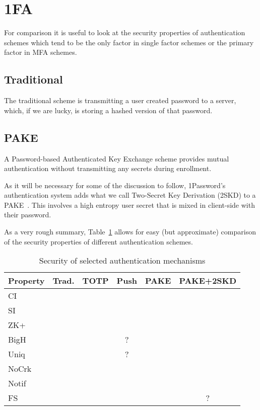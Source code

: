 \documentclass{soups}
\newcommand{\cmark}{\ding{51}}%
\newcommand{\xmark}{\ding{53}}%
\begin{document}
\section{1FA}

For comparison it is useful to look at the security properties
of authentication schemes which tend to be the only factor in single
factor schemes or the primary factor in MFA schemes.

\subsection{Traditional}
The traditional scheme is transmitting a user created password to a server,
which, if we are lucky, is storing a hashed version of that password.

\subsection{PAKE}
A Password-based Authenticated Key Exchange scheme provides mutual authentication
without transmitting any secrets during enrollment.

As it will be necessary for some of the discussion to follow,
1Password's authentication system adds what we call
Two-Secret Key Derivation (2SKD) to a PAKE~\autocite{1Password:whitepaper}.
This involves a
high entropy user secret that is mixed in client-side with their password.

As a very rough summary, Table~\ref{tab:props} allows for easy
(but approximate) comparison of the security properties of different
authentication schemes.

\begin{table}
  \caption{Security of selected authentication mechanisms}\label{tab:props}
  \begin{tabular}{lccccc}
    \textbf{Property} & \textbf{Trad.}   & \textbf{TOTP}    & \textbf{Push}    & \textbf{PAKE}   & \textbf{PAKE+2SKD} \\
    \hline
    CI       & \cmark  & \cmark  & \cmark  & \cmark  & \cmark \\
    SI       & \xmark  & \xmark  & \xmark  & \cmark  & \cmark \\
    ZK+      & \xmark  & \cmark  & \cmark  & \cmark  & \cmark \\
    BigH     & \xmark  & \cmark  & ?       & \xmark  & \cmark \\
    Uniq     & \xmark  & \cmark  & ?       & \xmark  & \cmark \\
    NoCrk    & \xmark  & \xmark  & \xmark  & \xmark  & \cmark \\
    Notif    & \xmark  & \xmark  & \cmark  & \xmark  & \xmark \\
    FS       & \xmark  & \cmark  & \cmark  & \xmark  & ?
  \end{tabular}
\end{table}
\end{document}
